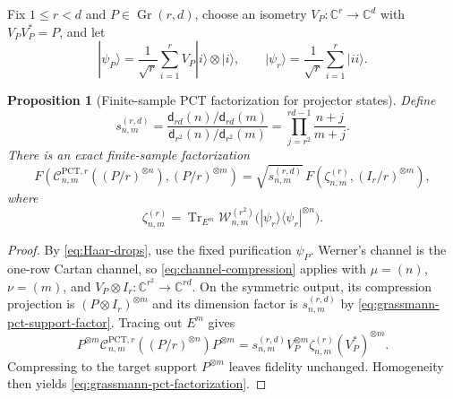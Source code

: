 \documentclass[11pt]{article}
\newtheorem{proposition}[proposition]{Proposition}
\theoremstyle{remark}
\theoremstyle{plain}
\newcommand{\C}{\mathbb C}
\newcommand{\cC}{\mathcal C}
\newcommand{\Gr}{\operatorname{Gr}}
\newcommand{\Tr}{\operatorname{Tr}}
\newcommand{\ket}[1]{|#1\rangle}
\newcommand{\proj}[1]{|#1\rangle\!\langle #1|}
\newcommand{\ot}{\otimes}
\begin{document}
Fix \(1\le r<d\) and \(P\in\Gr(r,d)\), choose an isometry
\(V_P:\C^r\to\C^d\) with \(V_PV_P^*=P\), and let
\[
  \ket{\psi_P}
  =\frac1{\sqrt r}\sum_{i=1}^r V_P\ket i\ot\ket i,
  \qquad
  \ket{\psi_r}=\frac1{\sqrt r}\sum_{i=1}^r\ket{ii}.
\]
\begin{proposition}[Finite-sample PCT factorization for projector states]
\label{prop:grassmann-pct-comparison}
Define
\begin{equation}
  s_{n,m}^{(r,d)}
  =\frac{\mathsf d_{rd}(n)/\mathsf d_{rd}(m)}
         {\mathsf d_{r^2}(n)/\mathsf d_{r^2}(m)}
  =\prod_{j=r^2}^{rd-1}\frac{n+j}{m+j}.
  \label{eq:grassmann-pct-support-factor}
\end{equation}
There is an exact finite-sample factorization
\begin{equation}
  F\!\left(
    \cC_{n,m}^{\mathrm{PCT},r}((P/r)^{\ot n}),(P/r)^{\ot m}
  \right)
  =\sqrt{s_{n,m}^{(r,d)}}\,
   F\!\left(\zeta_{n,m}^{(r)},(I_r/r)^{\ot m}\right),
  \label{eq:grassmann-pct-factorization}
\end{equation}
where
\begin{equation}
  \zeta_{n,m}^{(r)}
  =\Tr_{E^m}\mathcal W_{n,m}^{(r^2)}
    \bigl(\proj{\psi_r}^{\ot n}\bigr).
  \label{eq:grassmann-pct-internal-state}
\end{equation}
\end{proposition}

\begin{proof}
By \eqref{eq:Haar-drops}, use the fixed purification \(\psi_P\).
Werner's channel is the one-row Cartan channel, so
\eqref{eq:channel-compression} applies with \(\mu=(n)\), \(\nu=(m)\),
and \(V_P\ot I_r:\C^{r^2}\to\C^{rd}\).  On the symmetric output, its
compression projection is \((P\ot I_r)^{\ot m}\) and its dimension factor is
\(s_{n,m}^{(r,d)}\) by \eqref{eq:grassmann-pct-support-factor}.
Tracing out \(E^m\) gives
\begin{equation}
  P^{\ot m}\cC_{n,m}^{\mathrm{PCT},r}((P/r)^{\ot n})P^{\ot m}
  =s_{n,m}^{(r,d)}
   V_P^{\ot m}\zeta_{n,m}^{(r)}(V_P^*)^{\ot m}.
  \label{eq:grassmann-pct-system-compression}
\end{equation}
Compressing to the target support \(P^{\ot m}\) leaves fidelity
unchanged. Homogeneity then yields \eqref{eq:grassmann-pct-factorization}.
\end{proof}
\end{document}
